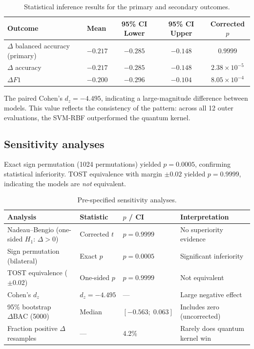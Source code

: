 \documentclass[11pt,a4paper]{article}
\newcommand{\BAC}{\mathrm{BAC}}
\begin{document}
\begin{table}[htbp]
\centering
\caption{Statistical inference results for the primary and secondary outcomes.}
\label{tab:inference}
\smallskip
\begin{tabular}{@{}llccc@{}}
\toprule
Outcome & Mean & 95\% CI Lower & 95\% CI Upper & Corrected $p$ \\
\midrule
$\Delta$ balanced accuracy (primary) & $-0.217$ & $-0.285$ & $-0.148$ & $0.9999$ \\
$\Delta$ accuracy                      & $-0.217$ & $-0.285$ & $-0.148$ & $2.38\times10^{-5}$ \\
$\Delta F1$                            & $-0.200$ & $-0.296$ & $-0.104$ & $8.05\times10^{-4}$ \\
\bottomrule
\end{tabular}
\end{table}

The paired Cohen's $d_z = -4.495$, indicating a large-magnitude difference
between models. This value reflects the consistency of the pattern: across all
12 outer evaluations, the SVM-RBF outperformed the quantum kernel.

\subsection{Sensitivity analyses}
\label{ssec:sensitivity}

Exact sign permutation (1024 permutations) yielded $p=0.0005$, confirming
statistical inferiority. TOST equivalence with margin $\pm 0.02$ yielded
$p=0.9999$, indicating the models are \emph{not} equivalent.

\begin{table}[htbp]
\centering
\caption{Pre-specified sensitivity analyses.}
\label{tab:sensitivity}
\smallskip
\begin{tabular}{@{}llll@{}}
\toprule
Analysis & Statistic & $p$ / CI & Interpretation \\
\midrule
Nadeau--Bengio (one-sided $H_1$: $\Delta>0$) & Corrected $t$ & $p=0.9999$ & No superiority evidence \\
Sign permutation (bilateral)  & Exact $p$  & $p=0.0005$ & Significant inferiority \\
TOST equivalence ($\pm 0.02$) & One-sided $p$ & $p=0.9999$ & Not equivalent \\
Cohen's $d_z$ & $d_z=-4.495$ & --- & Large negative effect \\
95\% bootstrap $\Delta\BAC$ (5000) & Median & $[-0.563;\; 0.063]$ & Includes zero (uncorrected) \\
Fraction positive $\Delta$ resamples & --- & 4.2\% & Rarely does quantum kernel win \\
\bottomrule
\end{tabular}
\end{table}
\end{document}

